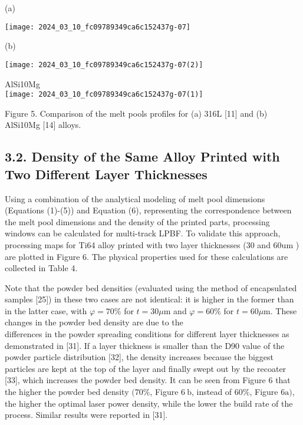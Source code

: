 \documentclass[10pt]{article}
\begin{document}
(a)

\begin{center}
\texttt{[image: 2024\_03\_10\_fc09789349ca6c152437g-07]}
\end{center}

(b)

\begin{center}
\texttt{[image: 2024\_03\_10\_fc09789349ca6c152437g-07(2)]}
\end{center}

AlSi10Mg\\
\texttt{[image: 2024\_03\_10\_fc09789349ca6c152437g-07(1)]}

Figure 5. Comparison of the melt pools profiles for (a) 316L [11] and (b) AlSi10Mg [14] alloys.

\subsection*{3.2. Density of the Same Alloy Printed with Two Different Layer Thicknesses}
Using a combination of the analytical modeling of melt pool dimensions (Equations (1)-(5)) and Equation (6), representing the correspondence between the melt pool dimensions and the density of the printed parts, processing windows can be calculated for multi-track LPBF. To validate this approach, processing maps for Ti64 alloy printed with two layer thicknesses (30 and $60 \mathrm{um}$ ) are plotted in Figure 6. The physical properties used for these calculations are collected in Table 4.

Note that the powder bed densities (evaluated using the method of encapsulated samples [25]) in these two cases are not identical: it is higher in the former than in the latter case, with $\varphi=70 \%$ for $t=30 \mu \mathrm{m}$ and $\varphi=60 \%$ for $t=60 \mu \mathrm{m}$. These changes in the powder bed density are due to the\\
differences in the powder spreading conditions for different layer thicknesses as demonstrated in [31]. If a layer thickness is smaller than the D90 value of the powder particle distribution [32], the density increases because the biggest particles are kept at the top of the layer and finally swept out by the recoater [33], which increases the powder bed density. It can be seen from Figure 6 that the higher the powder bed density $(70 \%$, Figure $6 \mathrm{~b}$, instead of $60 \%$, Figure $6 \mathrm{a})$, the higher the optimal laser power density, while the lower the build rate of the process. Similar results were reported in [31].
\end{document}
